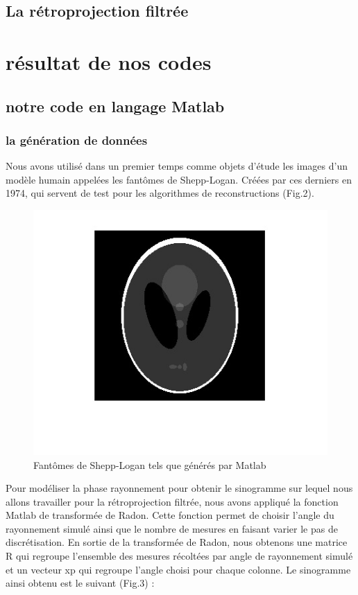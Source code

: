 \documentclass[conference]{IEEEtran}
\begin{document}
\subsection{La rétroprojection filtrée}




\section{résultat de nos codes}

\subsection{notre code en langage Matlab}

\subsubsection{la génération de données }

Nous avons utilisé dans un premier temps comme objets d'étude les images d'un modèle humain appelées les fantômes de Shepp-Logan. Créées par ces derniers en 1974, qui servent de test pour les algorithmes de reconstructions (Fig.2).

\begin{figure}[H]
\centering
\includegraphics[scale=0.7]{Shepp-logan}
\caption[Fantômes de Shepp-Logan tels que générés par Matlab]{Fantômes de Shepp-Logan tels que générés par Matlab}
\label{fig:gallery}
\end{figure}

Pour modéliser la phase rayonnement pour obtenir le sinogramme sur lequel nous allons travailler pour la rétroprojection filtrée, nous avons appliqué la fonction Matlab de transformée de Radon. Cette fonction permet de choisir l'angle du rayonnement simulé ainsi que le nombre de mesures en faisant varier le pas de discrétisation.
En sortie de la transformée de Radon, nous obtenons une matrice R qui regroupe l'ensemble des mesures récoltées par angle de rayonnement simulé et un vecteur xp qui regroupe l'angle choisi pour chaque colonne. Le sinogramme ainsi obtenu est le suivant (Fig.3) :
\end{document}
